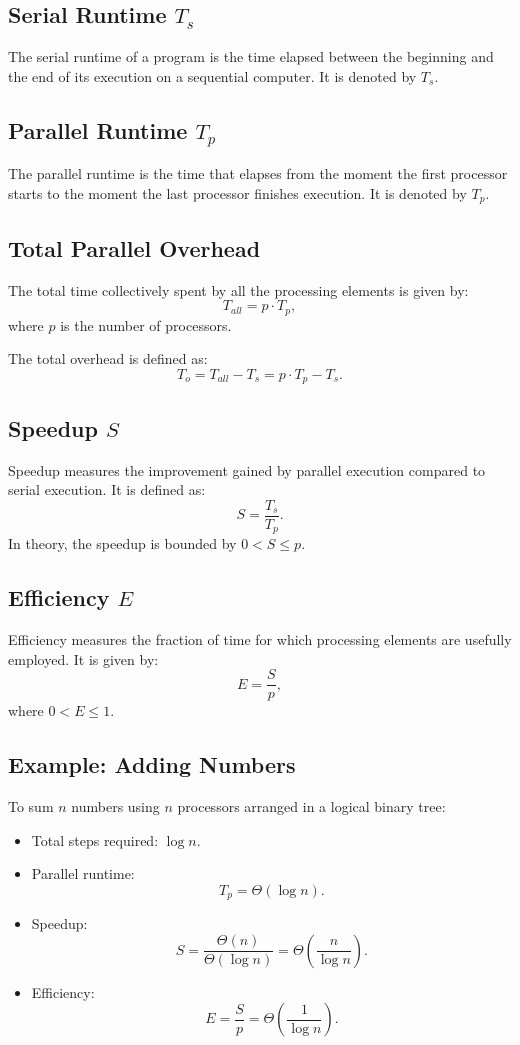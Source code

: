 \documentclass[12pt,a4paper]{article}
\begin{document}
\subsection{Serial Runtime \( T_s \)}
The serial runtime of a program is the time elapsed between the beginning and the end of its execution on a sequential computer. It is denoted by \( T_s \).

\subsection{Parallel Runtime \( T_p \)}
The parallel runtime is the time that elapses from the moment the first processor starts to the moment the last processor finishes execution. It is denoted by \( T_p \).

\subsection{Total Parallel Overhead}
The total time collectively spent by all the processing elements is given by:
\[
T_{all} = p \cdot T_p,
\]
where \( p \) is the number of processors.

The total overhead is defined as:
\[
T_o = T_{all} - T_s = p \cdot T_p - T_s.
\]

\subsection{Speedup \( S \)}
Speedup measures the improvement gained by parallel execution compared to serial execution. It is defined as:
\[
S = \frac{T_s}{T_p}.
\]
In theory, the speedup is bounded by \( 0 < S \leq p \).

\subsection{Efficiency \( E \)}
Efficiency measures the fraction of time for which processing elements are usefully employed. It is given by:
\[
E = \frac{S}{p},
\]
where \( 0 < E \leq 1 \).

\subsection{Example: Adding Numbers}
To sum \( n \) numbers using \( n \) processors arranged in a logical binary tree:
\begin{itemize}
    \item Total steps required: \( \log n \).
    \item Parallel runtime:
    \[
    T_p = \Theta(\log n).
    \]
    \item Speedup:
    \[
    S = \frac{\Theta(n)}{\Theta(\log n)} = \Theta\left(\frac{n}{\log n}\right).
    \]
    \item Efficiency:
    \[
    E = \frac{S}{p} = \Theta\left(\frac{1}{\log n}\right).
    \]
\end{itemize}
\end{document}
